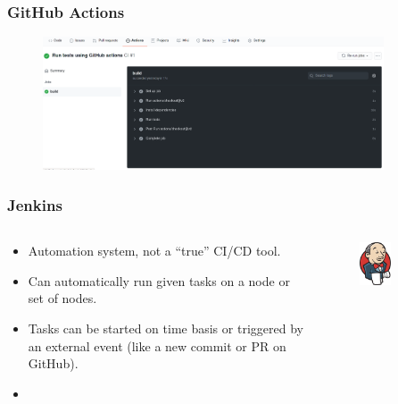 \documentclass[aspectratio=169]{beamer}
\begin{document}
\begin{frame}
	\frametitle{GitHub Actions}
	\begin{figure}[ht!]
	\begin{center}
  	  \includegraphics[width=0.9\textwidth]{img/gh-actions-2.png}
	\end{center}
	\end{figure}
\end{frame}

\begin{frame}
	\frametitle{Jenkins}
	
	\begin{columns}
\begin{column}{0.6\textwidth}
	\begin{block}{}
		\begin{itemize}
			\item Automation system, not a “true” CI/CD tool.
			\item Can automatically run given tasks on a node or set of nodes.
			\item Tasks can be started on time basis or triggered by an external event (like a new commit or PR on GitHub).
			\item {}

		\end{itemize}
	\end{block}
\end{column}
\begin{column}{0.4\textwidth}
	\begin{figure}[ht!]
	\begin{center}
  	  \includegraphics[width=0.5\textwidth]{img/jenkins.png}
	\end{center}
	\end{figure}
\end{column}
\end{columns}
\end{frame}
\end{document}
